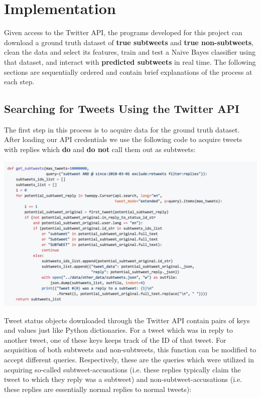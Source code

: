 \documentclass[11pt, twoside, reqno]{book}
\begin{document}
\chapter{Implementation}
\label{implementation}

Given access to the Twitter API, the programs developed for this project can download a ground truth dataset of \textbf{true subtweets} and \textbf{true non-subtweets}, clean the data and select its features, train and test a Naive Bayes classifier using that dataset, and interact with \textbf{predicted subtweets} in real time. The following sections are sequentially ordered and contain brief explanations of the process at each step.

\section{Searching for Tweets Using the Twitter API}
\label{searching_with_api}

The first step in this process is to acquire data for the ground truth dataset. After loading our API credentials we use the following code to acquire tweets with replies which \textbf{do} and \textbf{do not} call them out as subtweets:

\includegraphics[width=\textwidth]{get_subtweets}

Tweet status objects downloaded through the Twitter API contain pairs of keys and values just like Python dictionaries. For a tweet which was in reply to another tweet, one of these keys keeps track of the ID of that tweet. For acquisition of both subtweets and non-subtweets, this function can be modified to accept different queries. Respectively, these are the queries which were utilized in acquiring so-called subtweet-accusations (i.e. these replies typically claim the tweet to which they reply was a subtweet) and non-subtweet-accusations (i.e. these replies are essentially normal replies to normal tweets):
\end{document}
